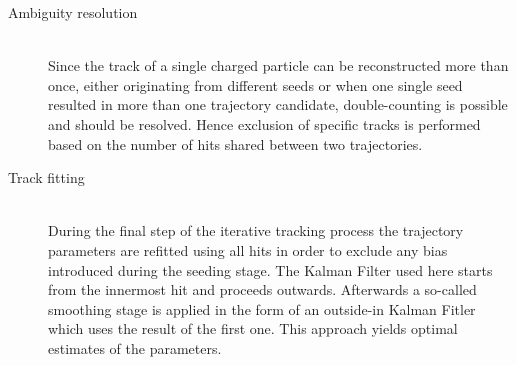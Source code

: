 \begin{myindentpar}
\begin{description}
    \item[Ambiguity resolution] \hfill \\
    Since the track of a single charged particle can be reconstructed more than once, either originating from different seeds or when one single seed resulted in more than one trajectory candidate, double-counting is possible and should be resolved. Hence exclusion of specific tracks is performed based on the number of hits shared between two trajectories. 
    \item[Track fitting] \hfill \\
    During the final step of the iterative tracking process the trajectory parameters are refitted using all hits in order to exclude any bias introduced during the seeding stage. The Kalman Filter used here starts from the innermost hit and proceeds outwards. Afterwards a so-called smoothing stage is applied in the form of an outside-in Kalman Fitler which uses the result of the first one. This approach yields optimal estimates of the parameters.
  \end{description}
\end{myindentpar}



